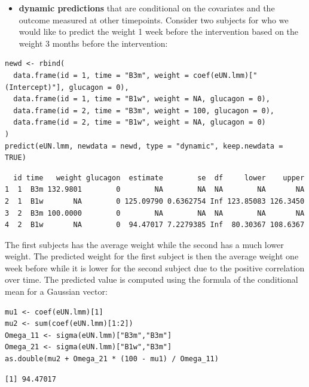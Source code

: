 \documentclass[12pt]{article}
\begin{document}
\begin{itemize}
\item \textbf{dynamic predictions} that are conditional on the covariates and the
outcome measured at other timepoints. Consider two subjects for who
we would like to predict the weight 1 week before the intervention
based on the weight 3 months before the intervention:
\end{itemize}

\begin{lstlisting}
newd <- rbind(
  data.frame(id = 1, time = "B3m", weight = coef(eUN.lmm)["(Intercept)"], glucagon = 0),
  data.frame(id = 1, time = "B1w", weight = NA, glucagon = 0),
  data.frame(id = 2, time = "B3m", weight = 100, glucagon = 0),
  data.frame(id = 2, time = "B1w", weight = NA, glucagon = 0)
)
predict(eUN.lmm, newdata = newd, type = "dynamic", keep.newdata = TRUE)
\end{lstlisting}

\begin{verbatim}
  id time   weight glucagon  estimate        se  df     lower    upper
1  1  B3m 132.9801        0        NA        NA  NA        NA       NA
2  1  B1w       NA        0 125.09790 0.6362754 Inf 123.85083 126.3450
3  2  B3m 100.0000        0        NA        NA  NA        NA       NA
4  2  B1w       NA        0  94.47017 7.2279385 Inf  80.30367 108.6367
\end{verbatim}


The first subjects has the average weight while the second has a much
  lower weight. The predicted weight for the first subject is then the
  average weight one week before while it is lower for the second
  subject due to the positive correlation over time. The predicted
  value is computed using the formula of the conditional mean for a
  Gaussian vector:
\lstset{language=r,label= ,caption= ,captionpos=b,numbers=none}
\begin{lstlisting}
mu1 <- coef(eUN.lmm)[1]
mu2 <- sum(coef(eUN.lmm)[1:2])
Omega_11 <- sigma(eUN.lmm)["B3m","B3m"]
Omega_21 <- sigma(eUN.lmm)["B1w","B3m"]
as.double(mu2 + Omega_21 * (100 - mu1) / Omega_11)
\end{lstlisting}

\begin{verbatim}
[1] 94.47017
\end{verbatim}



\clearpage
\end{document}
